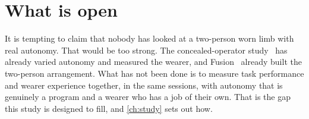 \section{What is open}

It is tempting to claim that nobody has looked at a two-person worn limb with
real autonomy. That would be too strong. The concealed-operator
study~\cite{zhou2026proxemics} has already varied autonomy and measured the
wearer, and Fusion~\cite{saraiji2018fusion} already built the two-person
arrangement. What has not been done is to measure task performance and wearer
experience together, in the same sessions, with autonomy that is genuinely a
program and a wearer who has a job of their own. That is the gap this study is
designed to fill, and \cref{ch:study} sets out how.
